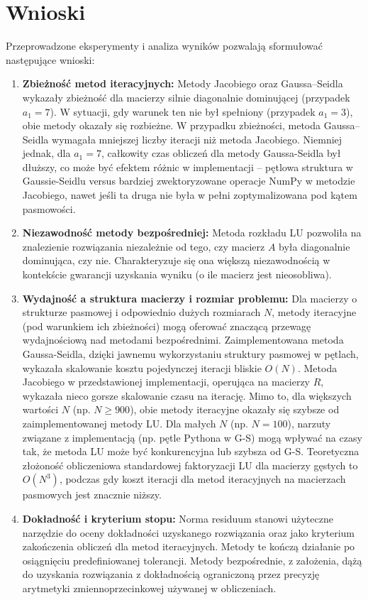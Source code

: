 \documentclass[a4paper, 11pt]{article}
\begin{document}
\section{Wnioski}
Przeprowadzone eksperymenty i analiza wyników pozwalają sformułować następujące wnioski:
\begin{enumerate}
    \item \textbf{Zbieżność metod iteracyjnych:} Metody Jacobiego oraz Gaussa–Seidla wykazały zbieżność dla macierzy silnie diagonalnie dominującej (przypadek $a_1=7$). W sytuacji, gdy warunek ten nie był spełniony (przypadek $a_1=3$), obie metody okazały się rozbieżne. W przypadku zbieżności, metoda Gaussa–Seidla wymagała mniejszej liczby iteracji niż metoda Jacobiego. Niemniej jednak, dla $a_1=7$, całkowity czas obliczeń dla metody Gaussa-Seidla był dłuższy, co może być efektem różnic w implementacji – pętlowa struktura w Gaussie-Seidlu versus bardziej zwektoryzowane operacje NumPy w metodzie Jacobiego, nawet jeśli ta druga nie była w pełni zoptymalizowana pod kątem pasmowości.
    \item \textbf{Niezawodność metody bezpośredniej:} Metoda rozkładu LU pozwoliła na znalezienie rozwiązania niezależnie od tego, czy macierz $A$ była diagonalnie dominująca, czy nie. Charakteryzuje się ona większą niezawodnością w kontekście gwarancji uzyskania wyniku (o ile macierz jest nieosobliwa).
    \item \textbf{Wydajność a struktura macierzy i rozmiar problemu:} Dla macierzy o strukturze pasmowej i odpowiednio dużych rozmiarach $N$, metody iteracyjne (pod warunkiem ich zbieżności) mogą oferować znaczącą przewagę wydajnościową nad metodami bezpośrednimi. Zaimplementowana metoda Gaussa-Seidla, dzięki jawnemu wykorzystaniu struktury pasmowej w pętlach, wykazała skalowanie kosztu pojedynczej iteracji bliskie $O(N)$. Metoda Jacobiego w przedstawionej implementacji, operująca na macierzy $R$, wykazała nieco gorsze skalowanie czasu na iterację. Mimo to, dla większych wartości $N$ (np. $N \ge 900$), obie metody iteracyjne okazały się szybsze od zaimplementowanej metody LU. Dla małych $N$ (np. $N=100$), narzuty związane z implementacją (np. pętle Pythona w G-S) mogą wpływać na czasy tak, że metoda LU może być konkurencyjna lub szybsza od G-S. Teoretyczna złożoność obliczeniowa standardowej faktoryzacji LU dla macierzy gęstych to $O(N^3)$, podczas gdy koszt iteracji dla metod iteracyjnych na macierzach pasmowych jest znacznie niższy.
    \item \textbf{Dokładność i kryterium stopu:} Norma residuum stanowi użyteczne narzędzie do oceny dokładności uzyskanego rozwiązania oraz jako kryterium zakończenia obliczeń dla metod iteracyjnych. Metody te kończą działanie po osiągnięciu predefiniowanej tolerancji. Metody bezpośrednie, z założenia, dążą do uzyskania rozwiązania z dokładnością ograniczoną przez precyzję arytmetyki zmiennoprzecinkowej używanej w obliczeniach.
\end{enumerate}
\end{document}
